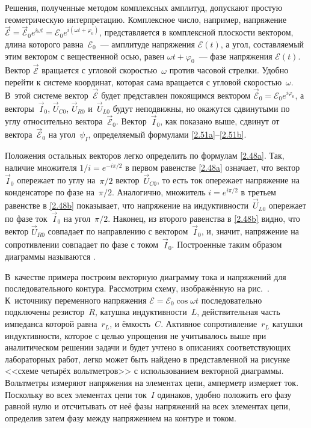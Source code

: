 Решения, полученные методом комплексных амплитуд, допускают простую
геометрическую интерпретацию. Комплексное число, например, напряжение
$\vec{\mathcal{E}}=\vec{\mathcal{E}}_0e^{i\omega t}=\mathcal{E}_0e^{i(\omega
t+\varphi_0)}$, представляется в комплексной плоскости вектором, длина которого
равна~$\mathcal{E}_0$~--- амплитуде напряжения $\mathcal{E}(t)$, а угол,
составляемый этим вектором с вещественной осью, равен $\omega
t+\varphi_0$~--- фазе напряжения $\mathcal{E}(t)$. Вектор $\vec{\mathcal{E}}$
вращается с угловой скоростью~$\omega$ против часовой стрелки. Удобно перейти к
системе координат, которая сама вращается с угловой скоростью~$\omega$. В~этой
системе вектор~$\vec{\mathcal{E}}$ будет представлен покоящимся вектором
$\vec{\mathcal{E}}_0=\mathcal{E}_0e^{i\varphi_0}$, а векторы~$\vec I_0$, $\vec{U}_{\! C0}$,
$\vec{U}_{\! R0}$ и~$\vec{U}_{\! L0}$ будут неподвижны, но окажутся сдвинутыми по углу
относительно вектора~$\vec{\mathcal{E}}_0$. Вектор~$\vec I_0$, как показано выше,
сдвинут от вектора~$\vec{\mathcal{E}}_0$ на угол~$\psi_I$, определяемый формулами
\eqref{2.51a}--\eqref{2.51b}.

Положения остальных векторов легко определить по формулам \eqref{2.48a}. Так,
наличие множителя $1/i=e^{-i\pi/2}$ в первом равенстве \eqref{2.48a} означает,
что вектор~$\vec I_0$ опережает по углу на~$\pi/2$ вектор~$\vec{U}_{\! C0}$, то есть
ток опережает напряжение на конденсаторе по фазе на~$\pi/2$. Аналогично,
множитель $i=e^{i\pi/2}$ в третьем равенстве в \eqref{2.48b} показывает, что
напряжение на индуктивности~$\vec{U}_{\! L0}$ опережает по фазе ток~$\vec I_0$ на
угол~$\pi/2$. Наконец, из второго равенства в \eqref{2.48b} видно, что вектор
$\vec{U}_{\! R0}$ совпадает по направлению с вектором~$\vec I_0$, и, значит,
напряжение на сопротивлении совпадает по фазе с током~$\vec I_0$. Построенные
таким образом диаграммы называются .

В~качестве примера построим векторную диаграмму тока и напряжений для
последовательного контура. Рассмотрим схему, изображённую на рис.~.
К~источнику переменного напряжения $\mathcal{E}=\mathcal{E}_0\cos\omega t$
последовательно подключены резистор~$R$, катушка индуктивности~$L$,
действительная часть импеданса которой равна~$r_L$, и ёмкость~$C$. Активное
сопротивление~$r_L$ катушки индуктивности, которое с целью упрощения не
учитывалось выше при аналитическом решении задачи и будет учтено в описаниях
соответствующих лабораторных работ, легко может быть найдено в представленной на
рисунке <<схеме четырёх вольтметров>> с использованием векторной диаграммы.
Вольтметры измеряют напряжения на элементах цепи, амперметр измеряет ток.
Поскольку во всех элементах цепи ток~$I$ одинаков, удобно положить его фазу
равной нулю и отсчитывать от неё фазы напряжений на всех элементах цепи,
определив затем фазу   между напряжением на контуре и током.

